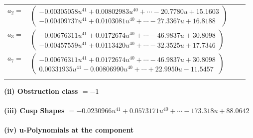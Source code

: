 \documentclass[1p]{elsarticle_modified}
\theoremstyle{definition}
\begin{document}
\begin{tabular}{m{7pt} m{180pt} m{7pt} m{180pt} }
\flushright $a_{2}=$&$\begin{pmatrix}-0.00305058 u^{41}+0.00802983 u^{40}+\cdots-20.7780 u+15.1603\\-0.00409737 u^{41}+0.0103081 u^{40}+\cdots-27.3367 u+16.8188\end{pmatrix}$ \\
\flushright $a_{3}=$&$\begin{pmatrix}-0.00676311 u^{41}+0.0172674 u^{40}+\cdots-46.9837 u+30.8098\\-0.00457559 u^{41}+0.0113420 u^{40}+\cdots-32.3525 u+17.7346\end{pmatrix}$ \\
\flushright $a_{7}=$&$\begin{pmatrix}-0.00676311 u^{41}+0.0172674 u^{40}+\cdots-46.9837 u+30.8098\\0.00331935 u^{41}-0.00806990 u^{40}+\cdots+22.9950 u-11.5457\end{pmatrix}$\\&\end{tabular}
\flushleft \textbf{(ii) Obstruction class $= -1$}\\~\\
\flushleft \textbf{(iii) Cusp Shapes $= -0.0230966 u^{41}+0.0573171 u^{40}+\cdots-173.318 u+88.0642$}\\~\\
\newpage\renewcommand{\arraystretch}{1}
\flushleft \textbf{(iv) u-Polynomials at the component}\newline \\
\end{document}
